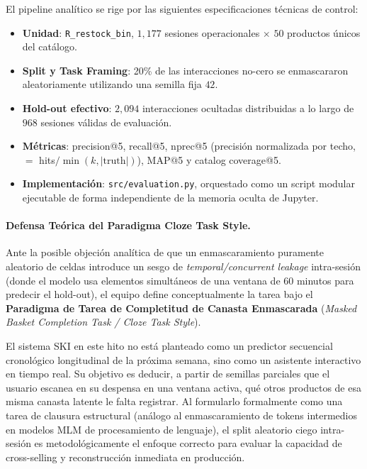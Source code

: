 \documentclass[12pt,a4paper]{article}
\newcommand{\code}[1]{\texttt{\small #1}}
\begin{document}
El pipeline analítico se rige por las siguientes especificaciones técnicas de control:

\begin{itemize}
    \item \textbf{Unidad}: \code{R\_restock\_bin}, $1{,}177$ sesiones operacionales $\times$ $50$ productos únicos del catálogo.
    \item \textbf{Split y Task Framing}: 20\% de las interacciones no-cero se enmascararon aleatoriamente utilizando una semilla fija $42$. 
    \item \textbf{Hold-out efectivo}: $2{,}094$ interacciones ocultadas distribuidas a lo largo de $968$ sesiones válidas de evaluación.
    \item \textbf{Métricas}: precision@5, recall@5, nprec@5 (precisión normalizada por techo, $=$ hits$/\min(k,|\text{truth}|)$), MAP@5 y catalog coverage@5.
    \item \textbf{Implementación}: \code{src/evaluation.py}, orquestado como un script modular ejecutable de forma independiente de la memoria oculta de Jupyter.
\end{itemize}

\paragraph{Defensa Teórica del Paradigma Cloze Task Style.} Ante la posible objeción analítica de que un enmascaramiento puramente aleatorio de celdas introduce un sesgo de \textit{temporal/concurrent leakage} intra-sesión (donde el modelo usa elementos simultáneos de una ventana de 60 minutos para predecir el hold-out), el equipo define conceptualmente la tarea bajo el \textbf{Paradigma de Tarea de Completitud de Canasta Enmascarada} (\textit{Masked Basket Completion Task / Cloze Task Style}). 

El sistema SKI en este hito no está planteado como un predictor secuencial cronológico longitudinal de la próxima semana, sino como un asistente interactivo en tiempo real. Su objetivo es deducir, a partir de semillas parciales que el usuario escanea en su despensa en una ventana activa, qué otros productos de esa misma canasta latente le falta registrar. Al formularlo formalmente como una tarea de clausura estructural (análogo al enmascaramiento de tokens intermedios en modelos MLM de procesamiento de lenguaje), el split aleatorio ciego intra-sesión es metodológicamente el enfoque correcto para evaluar la capacidad de cross-selling y reconstrucción inmediata en producción.
\end{document}
